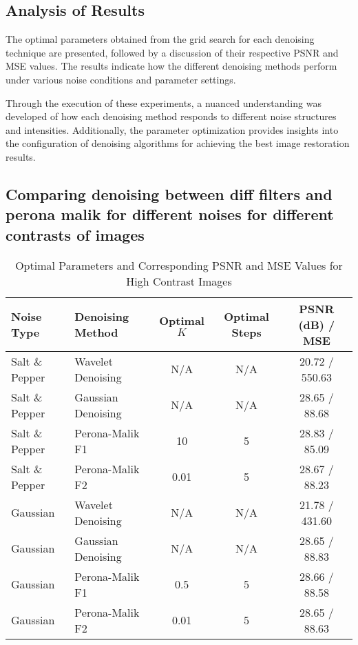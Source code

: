 \documentclass{article}
\begin{document}
\subsection{Analysis of Results}
The optimal parameters obtained from the grid search for each denoising technique are presented, followed by a discussion of their respective PSNR and MSE values. The results indicate how the different denoising methods perform under various noise conditions and parameter settings.


Through the execution of these experiments, a nuanced understanding was developed of how each denoising method responds to different noise structures and intensities. Additionally, the parameter optimization provides insights into the configuration of denoising algorithms for achieving the best image restoration results.


\subsection{Comparing denoising between diff filters and perona malik for different noises for different contrasts of images}

\begin{table}[H]
\centering
\caption{Optimal Parameters and Corresponding PSNR and MSE Values for High Contrast Images}
\label{tab:optimal_high_contrast_parameters}
\begin{tabular}{llccc}
\hline
Noise Type & Denoising Method & Optimal \( K \) & Optimal Steps & PSNR (dB) / MSE \\ \hline
Salt \& Pepper & Wavelet Denoising & N/A & N/A & 20.72 / 550.63 \\
Salt \& Pepper & Gaussian Denoising & N/A & N/A & 28.65 / 88.68 \\
Salt \& Pepper & Perona-Malik F1 & 10 & 5 & 28.83 / 85.09 \\
Salt \& Pepper & Perona-Malik F2 & 0.01 & 5 & 28.67 / 88.23 \\
Gaussian & Wavelet Denoising & N/A & N/A & 21.78 / 431.60 \\
Gaussian & Gaussian Denoising & N/A & N/A & 28.65 / 88.83 \\
Gaussian & Perona-Malik F1 & 0.5 & 5 & 28.66 / 88.58 \\
Gaussian & Perona-Malik F2 & 0.01 & 5 & 28.65 / 88.63 \\ \hline
\end{tabular}
\end{table}
\end{document}
